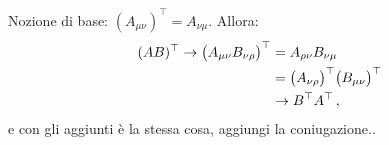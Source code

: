 \documentclass[main.tex]{subfiles}
\begin{document}
Nozione di base: \((A_{\mu \nu })^{\top} = A_{\nu \mu }\). Allora:
%
\begin{align}
(AB)^{\top} \to \qty(A_{\mu \nu } B_{\nu \rho })^{\top} &=
A_{\rho \nu } B_{\nu \mu }  \\
&= \qty(A_{\nu \rho })^{\top} \qty(B_{\mu \nu })^{\top} \\
& \to B^{\top} A ^{\top}
\,,
\end{align}
%
e con gli aggiunti è la stessa cosa, aggiungi la coniugazione..
\end{document}
